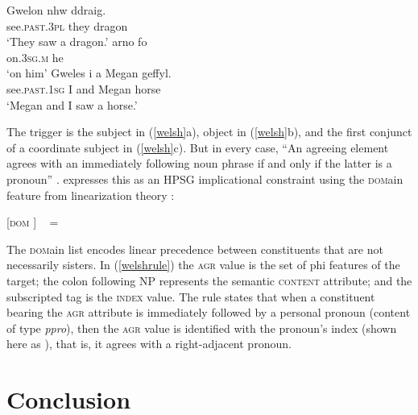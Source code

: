 \documentclass[output=paper
                ,modfonts
                ,nonflat
	        ,collection
	        ,collectionchapter
	        ,collectiontoclongg
 	        ,biblatex
                ,babelshorthands
                ,newtxmath
                ,draftmode
                ,colorlinks, citecolor=brown
]{./langsci/langscibook}
\begin{document}
{\begin{exe}
\ex \label{welsh}
\begin{xlist}
\ex
\gll 	Gwelon nhw ddraig. \\
see.\textsc{past.3pl} they dragon \\
\glt `They saw a dragon.’
\ex 
\gll 	arno fo \\
on.\textsc{3sg.m} he \\
\glt `on him’
\ex 
\gll 	Gweles i a Megan geffyl. \\
see.\textsc{past.1sg} I and Megan horse \\
\glt `Megan and I saw a horse.’
\end{xlist}
\end{exe}

\noindent
The trigger is the subject in (\ref{welsh}a), object in (\ref{welsh}b), and the first conjunct of a coordinate subject in (\ref{welsh}c).  But in every case, ``An agreeing element agrees with an immediately following noun phrase if and only if the latter is a pronoun'' \citep[example\,(48)]{Borsley:2009}. \citet[example\,(99)]{Borsley:2009} expresses this as an HPSG implicational constraint using the \textsc{dom}ain feature from linearization theory \citep{reape:1994,Mueller95c,Mueller99a,Kathol:2000}:

\begin{exe}
\ex \label{welshrule}
{}[\textsc{dom}   ]  %
\impl  \  = 
\end{exe}

\noindent
The \textsc{dom}ain list encodes linear precedence between constituents that are not necessarily sisters.  In (\ref{welshrule}) the \textsc{agr} value is the set of phi features of the target; the colon following NP represents the semantic \textsc{content} attribute; and the subscripted tag  is the \textsc{index} value.  The rule states that when a constituent bearing the \textsc{agr} attribute is immediately followed by a personal pronoun (content of type \textit{ppro}), then the \textsc{agr} value is identified with the pronoun's index (shown here as  ), that is, it agrees with a right-adjacent pronoun.  



\section{Conclusion} 

}
\end{document}
